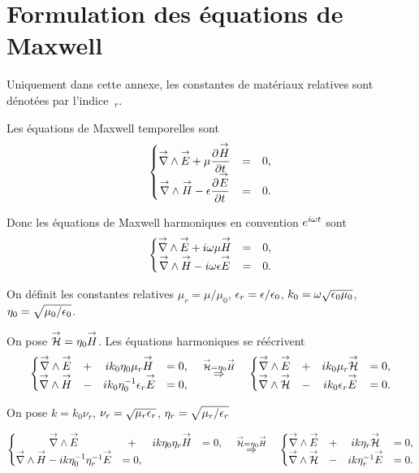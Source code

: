 \section{Formulation des équations de Maxwell}
\label{sec:annex:maxwell_equation}

Uniquement dans cette annexe, les constantes de matériaux relatives sont dénotées par l'indice \(~_r\).

Les équations de Maxwell temporelles sont
\begin{equation}
  \left\lbrace \begin{matrix}
  \vrot \vE + \mu \ddr{t}{\vect{H}} &=& 0,
  \\
  \vrot \vect{H} - \eps \ddr{t}{\vE} &=& 0.
  \end{matrix} \right.
\end{equation}

Donc les équations de Maxwell harmoniques en convention \(e^{i\w t}\) sont
\begin{equation}
  \left\lbrace \begin{matrix}
  \vrot \vE + i\w\mu \vect{H} &=& 0,
  \\
  \vrot \vect{H} - i\w\eps \vE &=& 0.
  \end{matrix} \right.
\end{equation}

On définit les constantes relatives \(\mu_r = \mu \slash \mu_0\), \(\eps_r = \eps \slash \eps_0\), \(k_0 = \w \sqrt {\eps_0\mu_0}\), \(\eta_0=\sqrt {\mu_0/\eps_0}\).

On pose \(\vH = \eta_0 \vect{H}\).
Les équations harmoniques se réécrivent
\begin{equation}
\left\lbrace \begin{matrix}
\vrot \vE & + & ik_0\eta_0\mu_r \vect{H} &= 0,
\\
\vrot \vect{H} & - & ik_0\eta_0^{-1}\eps_r \vE &= 0,
\end{matrix} \right.
\quad
\overset{\vH = \eta_0 \vect{H}}{\Rightarrow}
\quad
\left\lbrace \begin{matrix}
\vrot \vE & + & ik_0\mu_r \vH &= 0,
\\
\vrot \vH & - & ik_0\eps_r \vE &= 0.
\end{matrix} \right.
\end{equation}

On pose \(k=k_0\nu_r\), \(\nu_r = \sqrt{\mu_r\eps_r}\), \(\eta_r = \sqrt{\mu_r \slash \eps_r}\)

\begin{equation}
\left\lbrace \begin{matrix}
\vrot \vE & + & ik\eta_0\eta_r \vect{H} &= 0,
\\
\vrot \vect{H} - ik\eta_0^{-1}\eta_r^{-1} \vE &= 0,
\end{matrix} \right.
\quad
\overset{\vH = \eta_0 \vect{H}}{\Rightarrow}
\quad
\left\lbrace \begin{matrix}
\vrot \vE & + & ik\eta_r \vH &= 0,
\\
\vrot \vH & - & ik\eta_r^{-1} \vE &= 0.
\end{matrix} \right.
\end{equation}
